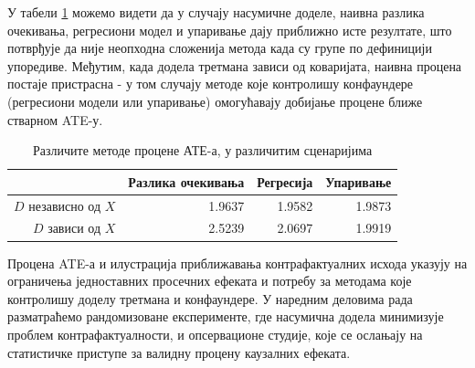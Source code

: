 \documentclass[12pt, a4paper]{article}
\begin{document}
У табели \ref{tab:ate_estim} можемо видети да у случају насумичне доделе, наивна разлика очекивања, регресиони модел и упаривање дају приближно исте резултате, што потврђује да није неопходна сложенија метода када су групе по дефиницији упоредиве. Међутим, када додела третмана зависи од коваријата, наивна процена постаје пристрасна - у том случају методе које контролишу конфаундере (регресиони модели или упаривање) омогућавају добијање процене ближе стварном ATE-у. 

\begin{table}[ht]
\centering
\begin{tabular}{rrrr}
  \hline
 & Разлика очекивања & Регресија & Упаривање \\ 
  \hline
$D$ независно од $X$ & 1.9637 & 1.9582 & 1.9873 \\ 
  $D$ зависи од $X$ & 2.5239 & 2.0697 & 1.9919 \\ 
   \hline
\end{tabular}
\caption{Различите методе процене АТЕ-а, у различитим сценаријима} 
\label{tab:ate_estim}
\end{table}


Процена ATE-а и илустрација приближавања контрафактуалних исхода указују на ограничења једноставних просечних ефеката и потребу за методама које контролишу доделу 
третмана и конфаундере. У наредним деловима рада разматраћемо рандомизоване експерименте, где насумична додела минимизује проблем контрафактуалности, и опсервационе 
студије, које се ослањају на статистичке приступе за валидну процену каузалних ефеката.




\end{document}
